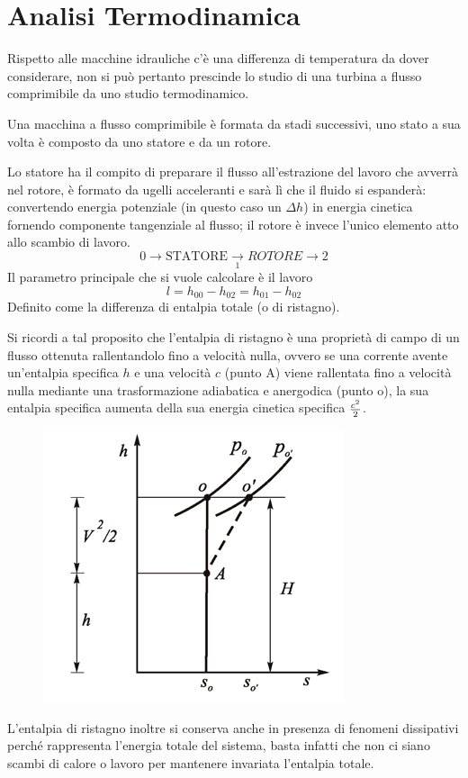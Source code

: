 \documentclass[a4paper, 15pt]{article}
\begin{document}
\section{Analisi Termodinamica}
\begin{adjustwidth}{2in}{}
	Rispetto alle macchine idrauliche c'è una differenza di temperatura da dover considerare, non si può pertanto prescinde lo studio di una turbina a flusso comprimibile da uno studio termodinamico. \newline 
	
	Una macchina a flusso comprimibile è formata da stadi successivi, uno stato a sua volta è composto da uno statore e da un rotore. 
	
	Lo statore ha il compito di preparare il flusso all'estrazione del lavoro che avverrà nel rotore, è formato da ugelli acceleranti e sarà lì che il fluido si espanderà: convertendo energia potenziale (in questo caso un $\Delta h$) in energia cinetica fornendo componente tangenziale al flusso; il rotore è invece l'unico elemento atto allo scambio di lavoro. 
	\[0\rightarrow\boxed{\text{STATORE}}\underset{1}{\rightarrow}\boxed{ROTORE}\rightarrow2\]
	Il parametro principale che si vuole calcolare è il lavoro
	\[l = h_{00}-h_{02} = h_{01} - h_{02}\]
	Definito come la differenza di entalpia totale (o di ristagno). \newline
	
	Si ricordi a tal proposito che l'entalpia di ristagno è una proprietà di campo di un flusso ottenuta rallentandolo fino a velocità nulla, ovvero se una corrente avente un'entalpia specifica $h$ e una velocità $c$ (punto A) viene rallentata fino a velocità nulla mediante una trasformazione adiabatica e
	anergodica (punto o), la sua entalpia specifica aumenta della sua energia cinetica specifica $c^2\over2$.
	\begin{figure}[H]
		\centering
		\includegraphics[width=0.3\linewidth]{immagini/entalpia}
		\label{fig:entalpia}
	\end{figure}
	L'entalpia di ristagno inoltre si conserva anche in presenza di fenomeni dissipativi perché rappresenta l'energia totale del sistema, basta infatti che non ci siano scambi di calore o lavoro per mantenere invariata l'entalpia totale. 
\end{adjustwidth}	
\end{document}
